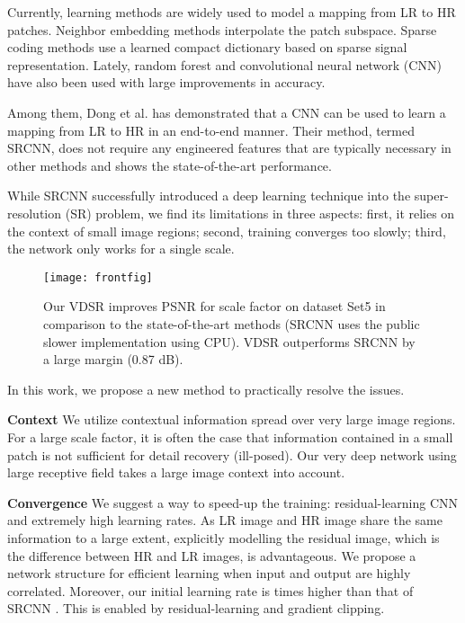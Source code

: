 \documentclass[10pt,twocolumn,letterpaper]{article}
\begin{document}
Currently, learning methods are widely used to model a mapping from LR to HR patches. Neighbor embedding \cite{chang2004super,bevilacqua2012} methods interpolate the patch subspace. Sparse coding \cite{yang2010image,zeyde2012single,Timofte2013,Timofte} methods use a learned compact dictionary based on sparse signal representation. Lately, random forest \cite{schulter2015fast} and convolutional neural network (CNN) \cite{dong2015image} have also been used with large improvements in accuracy.

Among them, Dong et al. \cite{dong2015image} has demonstrated that a CNN can be used to learn a mapping from LR to HR in an end-to-end manner. Their method, termed SRCNN, does not require any engineered features that are typically necessary in other methods \cite{yang2010image,zeyde2012single,Timofte2013,Timofte} and shows the state-of-the-art performance.

While SRCNN successfully introduced a deep learning technique into the super-resolution (SR) problem, we find its limitations in three aspects: first, it relies on the context of small image regions; second, training converges too slowly; third, the network only works for a single scale.

\begin{figure}
\centering
{\graphicspath{{figs/figf/}}\texttt{[image: frontfig]}}
\caption{Our VDSR improves PSNR for scale factor  on dataset Set5 in comparison to the state-of-the-art methods (SRCNN uses the public slower implementation using CPU). VDSR outperforms SRCNN by a large margin (0.87 dB).}
\label{fig:method_comparison}
\end{figure}



In this work, we propose a new method to practically resolve the issues.


\textbf{Context} We utilize contextual information spread over very large image regions. For a large scale factor, it is often the case that information contained in a small patch is not sufficient for detail recovery (ill-posed). Our very deep network using large receptive field takes a large image context into account.

\textbf{Convergence} We suggest a way to speed-up the training: residual-learning CNN and extremely high learning rates. As LR image and HR image share the same information to a large extent, explicitly modelling the residual image, which is the difference between HR and LR images, is advantageous. We propose a network structure for efficient learning when input and output are highly correlated. Moreover, our initial learning rate is  times higher than that of SRCNN \cite{dong2015image}. This is enabled by residual-learning and gradient clipping.
\end{document}
